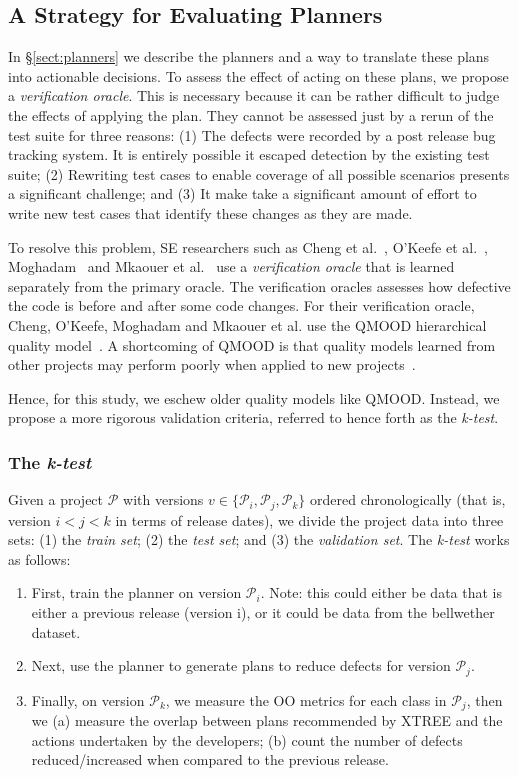 \documentclass[10pt,journal,compsoc]{IEEEtran}
\newcommand{\be}{\begin{enumerate}}
\newcommand{\ee}{\end{enumerate}}
\newcommand{\tion}[1]{\S\ref{sect:#1}}
\begin{document}
\subsection{A Strategy for Evaluating Planners}


% 

In \tion{planners} we describe the planners and a way to translate these plans into actionable decisions. To assess the effect of acting on these plans, we propose a  \textit{verification oracle}. This is necessary because it can be rather difficult  to judge the  effects of applying the plan. They cannot be assessed just by a rerun of the test suite for three reasons: (1) The defects were recorded by a post release bug tracking system. It is entirely possible it escaped detection by the existing test suite; (2) Rewriting test cases to enable coverage of all possible scenarios presents a significant challenge; and (3) It make take a significant amount of effort to write new test cases that identify these changes as they are made.

To resolve this problem, SE researchers such as
Cheng et al.~\cite{Cheng10}, O'Keefe et al.~\cite{OKeeffe08,OKeeffe07},
Moghadam~\cite{Moghadam2011} and Mkaouer et al.~\cite{Mkaouer14}
use a {\em verification oracle} that is learned separately from the primary oracle. The verification oracles assesses how defective the code is before and after some code changes. For their verification oracle, Cheng, O'Keefe, Moghadam and  Mkaouer et al. use the QMOOD hierarchical quality model~\cite{Bansiya02}.
A shortcoming of QMOOD is that quality models learned from other projects may perform poorly when applied to new projects~\cite{localvsglobal}.

Hence, for this study, we  eschew
older quality models like QMOOD. Instead, we propose a more rigorous validation criteria, referred to hence forth as the \textit{k-test}.


\subsubsection{The \textit{k-test}}

Given a project $\mathcal{P}$ with versions $v\in\{\mathcal{P}_i, \mathcal{P}_j, \mathcal{P}_k\}$ ordered chronologically (that is, version $i<j<k$ in terms of release dates), we divide the project data  into three sets: (1) the \textit{train set}; (2) the \textit{test set}; and (3) the \textit{validation set}. The \textit{k-test} works as follows:
\be
\item First, train the planner on version $\mathcal{P}_i$. Note: this could either be data that is either a previous release (version i), or it could be data from the bellwether dataset. 
\item Next, use the planner to generate plans to reduce defects for version $\mathcal{P}_j$.
\item Finally, on version  $\mathcal{P}_k$, we measure the OO metrics for each class in $\mathcal{P}_j$, then we (a) measure the overlap between plans recommended by XTREE and the actions undertaken by the developers; (b) count the number of defects reduced/increased when compared to the previous release.
\ee
\end{document}
